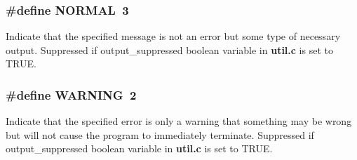 \subsubsection{\setlength{\rightskip}{0pt plus 5cm}\#define NORMAL\ 3}\label{group__output__type_a2}


Indicate that the specified message is not an error but some type of necessary output. Suppressed if output\_\-suppressed boolean variable in {\bf util.c} is set to TRUE. 
\subsubsection{\setlength{\rightskip}{0pt plus 5cm}\#define WARNING\ 2}\label{group__output__type_a1}


Indicate that the specified error is only a warning that something may be wrong but will not cause the program to immediately terminate. Suppressed if output\_\-suppressed boolean variable in {\bf util.c} is set to TRUE. 